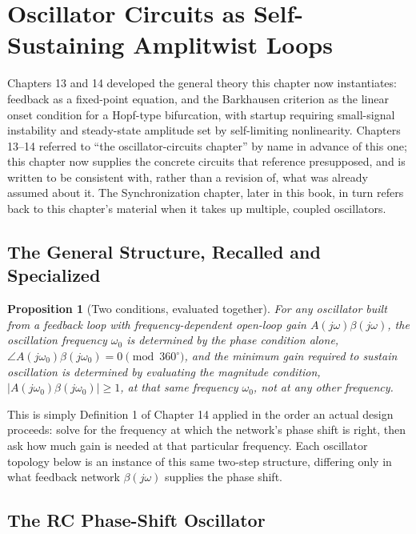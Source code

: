 \documentclass[12pt]{article}
\newtheorem{proposition}{Proposition}
\begin{document}
\section{Oscillator Circuits as Self-Sustaining Amplitwist Loops}

Chapters 13 and 14 developed the general theory this chapter now instantiates: feedback as a fixed-point equation, and the Barkhausen criterion as the linear onset condition for a Hopf-type bifurcation, with startup requiring small-signal instability and steady-state amplitude set by self-limiting nonlinearity. Chapters 13--14 referred to ``the oscillator-circuits chapter'' by name in advance of this one; this chapter now supplies the concrete circuits that reference presupposed, and is written to be consistent with, rather than a revision of, what was already assumed about it. The Synchronization chapter, later in this book, in turn refers back to this chapter's material when it takes up multiple, coupled oscillators.

\subsection{The General Structure, Recalled and Specialized}

\begin{proposition}[Two conditions, evaluated together]
For any oscillator built from a feedback loop with frequency-dependent open-loop gain $A(j\omega)\beta(j\omega)$, the oscillation frequency $\omega_0$ is determined by the phase condition alone, $\angle A(j\omega_0)\beta(j\omega_0) = 0 \pmod{360^\circ}$, and the minimum gain required to sustain oscillation is determined by evaluating the magnitude condition, $|A(j\omega_0)\beta(j\omega_0)| \geq 1$, at that same frequency $\omega_0$, not at any other frequency.
\end{proposition}

This is simply Definition 1 of Chapter 14 applied in the order an actual design proceeds: solve for the frequency at which the network's phase shift is right, then ask how much gain is needed at that particular frequency. Each oscillator topology below is an instance of this same two-step structure, differing only in what feedback network $\beta(j\omega)$ supplies the phase shift.

\subsection{The RC Phase-Shift Oscillator}
\end{document}
